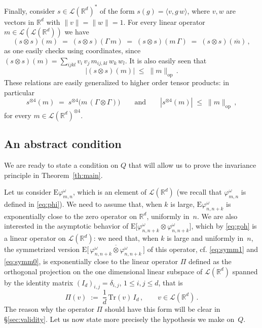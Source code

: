 \documentclass[a4paper,reqno,11pt]{amsart}
\numberwithin{equation}{section}
\newcommand{\cL}{{\ensuremath{\mathcal L}} }
\newcommand{\gd}{\delta}
\newcommand{\go}{\omega}
\newcommand{\R}{\mathbb{R}}
\def\bE{\ensuremath{\bs{\mathrm{E}}}}
\def\bs{\boldsymbol}
\renewcommand{\phi}{\varphi}
\begin{document}
Finally, consider $s \in \cL(\R^d)^*$ of the form
$s(g) = \langle v, g\, w \rangle$, where $v, w$
are vectors in $\R^d$ with $\| v \| = \|w \| = 1$.
For every linear operator $m\in \cL(\cL(\R^d))$ we have
\begin{equation} \label{eq:symm2}
	(s \otimes s)(m) \;=\; (s \otimes s)(\Gamma \,m) \;=\; (s \otimes s)(m \, \Gamma)
	 \;=\; (s \otimes s)(\overline m) \,,
\end{equation}
as one easily checks using coordinates, since
$(s \otimes s)(m) = \sum_{ijkl} v_i \, v_j \, m_{ij,kl} \,  w_k \, w_l$.
It is also easily seen that
\begin{equation} \label{eq:two}
|(s \otimes s)(m)| \; \le \; \| m\|_{\text{op}} \,.
\end{equation}
These relations are easily generalized to higher order tensor products: in particular
\begin{equation} \label{eq:k}
	s^{\otimes 4}(m)
	\;=\; s^{\otimes 4} \big( m \, (\Gamma \otimes \Gamma) \big) 
	\qquad \text{and} \qquad
	| s^{\otimes 4}(m) | \;\le\; \| m \|_{\text{op}}\,,
\end{equation}
for every $m \in \cL(\R^d)^{\otimes 4}$.



\smallskip

\subsection{An abstract condition}

We are ready to state a condition on $Q$ that
will allow us to
prove the invariance principle in Theorem~\ref{th:main}.

Let us consider $\bE \phi^\go_{m,n}$, which is an element of $\cL(\R^d)$
(we recall that $\phi^\go_{m,n}$ is defined in \eqref{eq:phi}). We need to assume
that, when $k$ is large, $\bE \phi^\go_{n,n+k}$
is exponentially close to the zero operator on $\R^d$, uniformly in~$n$.
We are also interested in the asymptotic behavior of
$\bE \big[ \phi^{\go}_{n,n+k} \otimes \phi^{\go}_{n,n+k} \big]$,
which by \eqref{eq:goh} is a linear operator on $\cL(\R^d)$: we need that,
when $k$ is large and uniformly in~$n$,
the symmetrized version
$\bE \big[\, \overline{\phi^{\go}_{n,n+k} \otimes \phi^{\go}_{n,n+k}} \, \big]$
of this operator, cf. \eqref{eq:symm1} and \eqref{eq:symm0}, is exponentially close 
to the linear operator $\Pi$ defined as 
the orthogonal projection on the one dimensional
linear subspace of $\cL(\R^d)$ spanned by the identity matrix $(I_d)_{i,j} = \gd_{i,j}$,
$1 \le i,j \le d$, that is
\begin{equation} \label{eq:Pi}
	\Pi(v) \;:=\; \frac 1d \, \text{Tr}(v) \, I_d\,, \qquad
	v \in \cL(\R^d)\,.
\end{equation}
The reason why the operator $\Pi$ should have this form will be clear in \S\ref{sec:validity}.
Let us now state more precisely the hypothesis we make on~$Q$.
\end{document}
